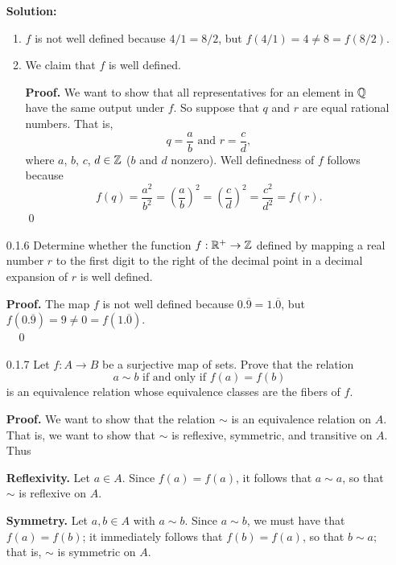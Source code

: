 \begin{enumerate}
      \textbf{Solution:}
         \begin{enumerate}
            \item $f$ is not well defined because $4/1 = 8/2$, but
                  $f(4/1) = 4 \neq 8 = f(8/2)$.
            \item We claim that $f$ is well defined.

                  \textbf{Proof.} We want to show that all representatives for 
                  an element in $\mathbb{Q}$ have the same output under $f$. So suppose
                  that $q$ and $r$ are equal rational numbers. That is,
                  $$q = \frac{a}{b} \text{ and } r = \frac{c}{d},$$
                  where $a$, $b$, $c$, $d \in \mathbb{Z}$ ($b$ and $d$ nonzero). Well
                  definedness of $f$ follows because
                  $$f(q) = \frac{a^2}{b^2} = \left(\frac{a}{b}\right)^2 =
                    \left(\frac{c}{d}\right)^2 = \frac{c^2}{d^2} = f(r).$$ \qed
         \end{enumerate}
   \item[0.1.6] Determine whether the function $f: \mathbb{R}^+ \rightarrow \mathbb{Z}$ defined
                by mapping a real number $r$ to the first digit to the right of
                the decimal point in a decimal expansion of $r$ is well defined.

      \textbf{Proof.} The map $f$ is not well defined because
      $0.\overline{9} = 1.\overline{0}$, but
      $f(0.\overline{9}) = 9 \neq 0 = f(1.\overline{0})$. \\ \mbox{ } \qed
   \item[0.1.7] Let $f : A \rightarrow B$ be a surjective map of sets. Prove
                that the relation
                $$a \sim b \mbox{ if and only if } f(a) = f(b)$$
                is an equivalence relation whose equivalence classes are the
                fibers of $f$.

      \textbf{Proof.} We want to show that the relation $\sim$ is an equivalence
      relation on $A$. That is, we want to show that $\sim$ is reflexive,
      symmetric, and transitive on $A$. Thus

      \textbf{Reflexivity.} Let $a \in A$. Since $f(a) = f(a)$, it follows that 
      $a \sim a$, so that $\sim$ is reflexive on $A$.

      \textbf{Symmetry.} Let $a, b \in A$ with $a \sim b$. Since $a \sim b$, we 
      must have that $f(a) = f(b)$; it immediately follows that $f(b) = f(a)$, 
      so that $b \sim a$; that is, $\sim$ is symmetric on $A$.


\end{enumerate}

